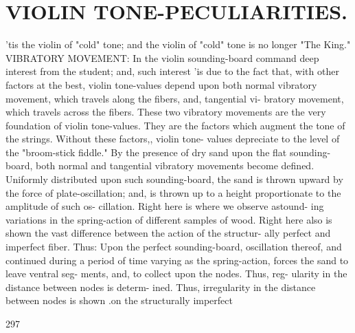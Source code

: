 \documentclass{article}
\begin{document}
\section*{VIOLIN TONE-PECULIARITIES.}
'tis the violin of "cold" tone; and the violin of "cold" tone is no longer "The King." VIBRATORY MOVEMENT: In the violin sounding-board command deep interest from the student; and, such interest 'is due to the fact that, with other factors at the best, violin tone-values depend upon both normal vibratory movement, which travels along the fibers, and, tangential vi- bratory movement, which travels across the fibers. These two vibratory movements are the very foundation of violin tone-values. They are the factors which augment the tone of the strings. Without these factors,, violin tone- values depreciate to the level of the "broom-stick fiddle." By the presence of dry sand upon the flat sounding-board, both normal and tangential vibratory movements become defined. Uniformly distributed upon such sounding-board, the sand is thrown upward by the force of plate-oscillation; and, is thrown up to a height proportionate to the amplitude of such os- cillation. Right here is where we observe astound- ing variations in the spring-action of different samples of wood. Right here also is shown the vast difference between the action of the structur- ally perfect and imperfect fiber. Thus: Upon the perfect sounding-board, oscillation thereof, and continued during a period of time varying as the spring-action, forces the sand to leave ventral seg- ments, and, to collect upon the nodes. Thus, reg- ularity in the distance between nodes is determ- ined. Thus, irregularity in the distance between nodes is shown .on the structurally imperfect

297
\end{document}
